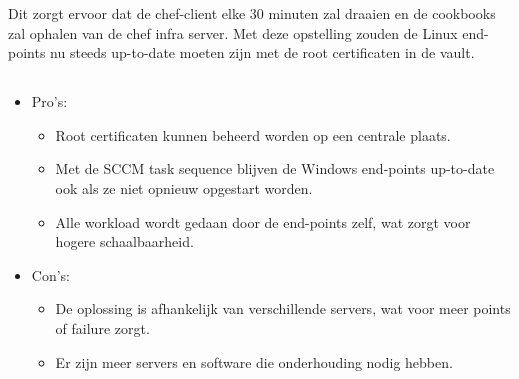 Dit zorgt ervoor dat de chef-client elke 30 minuten zal draaien en de cookbooks zal ophalen van de chef infra server.
Met deze opstelling zouden de Linux end-points nu steeds up-to-date moeten zijn met de root certificaten in de vault. \\

\pagebreak

\subsection{}
\label{subsec:Pros_en_Cons_van_de_tweede_oplossing}

\begin{itemize}
    \item Pro's:
    \begin{itemize}
        \item Root certificaten kunnen beheerd worden op een centrale plaats.
        \item Met de SCCM task sequence blijven de Windows end-points up-to-date ook als ze niet opnieuw opgestart worden.
        \item Alle workload wordt gedaan door de end-points zelf, wat zorgt voor hogere schaalbaarheid.
    \end{itemize}
    \item Con's:
    \begin{itemize}
        \item De oplossing is afhankelijk van verschillende servers, wat voor meer points of failure zorgt.
        \item Er zijn meer servers en software die onderhouding nodig hebben.
    \end{itemize}
\end{itemize}

